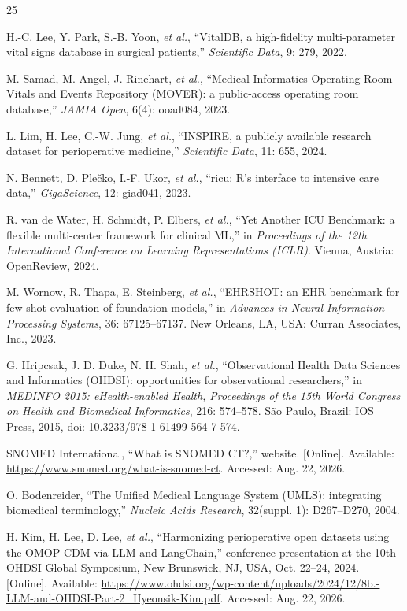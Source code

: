 \begin{thebibliography}{25}

H.-C. Lee, Y. Park, S.-B. Yoon, \emph{et al.}, ``VitalDB, a high-fidelity multi-parameter vital signs database in surgical patients,'' \emph{Scientific Data}, 9: 279, 2022.

M. Samad, M. Angel, J. Rinehart, \emph{et al.}, ``Medical Informatics Operating Room Vitals and Events Repository (MOVER): a public-access operating room database,'' \emph{JAMIA Open}, 6(4): ooad084, 2023.

L. Lim, H. Lee, C.-W. Jung, \emph{et al.}, ``INSPIRE, a publicly available research dataset for perioperative medicine,'' \emph{Scientific Data}, 11: 655, 2024.

N. Bennett, D. Ple\v{c}ko, I.-F. Ukor, \emph{et al.}, ``ricu: R's interface to intensive care data,'' \emph{GigaScience}, 12: giad041, 2023.

R. van de Water, H. Schmidt, P. Elbers, \emph{et al.}, ``Yet Another ICU Benchmark: a flexible multi-center framework for clinical ML,'' in \emph{Proceedings of the 12th International Conference on Learning Representations (ICLR)}. Vienna, Austria: OpenReview, 2024.

M. Wornow, R. Thapa, E. Steinberg, \emph{et al.}, ``EHRSHOT: an EHR benchmark for few-shot evaluation of foundation models,'' in \emph{Advances in Neural Information Processing Systems}, 36: 67125--67137. New Orleans, LA, USA: Curran Associates, Inc., 2023.

G. Hripcsak, J. D. Duke, N. H. Shah, \emph{et al.}, ``Observational Health Data Sciences and Informatics (OHDSI): opportunities for observational researchers,'' in \emph{MEDINFO 2015: eHealth-enabled Health, Proceedings of the 15th World Congress on Health and Biomedical Informatics}, 216: 574--578. S\~ao Paulo, Brazil: IOS Press, 2015, doi: 10.3233/978-1-61499-564-7-574.

SNOMED International, ``What is SNOMED CT?,'' website. [Online]. Available: \url{https://www.snomed.org/what-is-snomed-ct}. Accessed: Aug. 22, 2026.

O. Bodenreider, ``The Unified Medical Language System (UMLS): integrating biomedical terminology,'' \emph{Nucleic Acids Research}, 32(suppl. 1): D267--D270, 2004.

H. Kim, H. Lee, D. Lee, \emph{et al.}, ``Harmonizing perioperative open datasets using the OMOP-CDM via LLM and LangChain,'' conference presentation at the 10th OHDSI Global Symposium, New Brunswick, NJ, USA, Oct. 22--24, 2024. [Online]. Available: \url{https://www.ohdsi.org/wp-content/uploads/2024/12/8b.-LLM-and-OHDSI-Part-2_Hyeonsik-Kim.pdf}. Accessed: Aug. 22, 2026.


\end{thebibliography}
